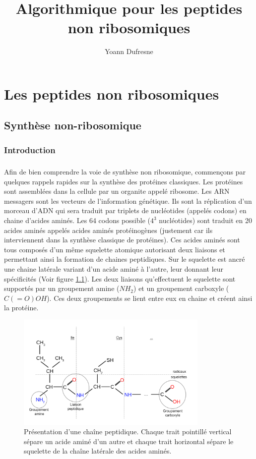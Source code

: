 \documentclass[12pt,french,twoside]{report}
\title{Algorithmique pour les peptides non ribosomiques}
\author{Yoann Dufresne}
\begin{document}
\maketitle
\tableofcontents

\chapter{Les peptides non ribosomiques}

\section{Synthèse non-ribosomique}

\subsection{Introduction}

\paragraph{}Afin de bien comprendre la voie de synthèse non ribosomique, commençons par quelques rappels rapides sur la synthèse des protéines classiques.
Les protéines sont assemblées dans la cellule par un organite appelé ribosome.
Les ARN messagers sont les vecteurs de l'information génétique.
Ils sont la réplication d'un morceau d'ADN qui sera traduit par triplets de nucléotides (appelés codons) en chaine d'acides aminés.
Les 64 codons possible ($4^3$ nucléotides) sont traduit en 20 acides aminés appelés acides aminés protéinogènes (justement car ils interviennent dans la synthèse classique de protéines).
Ces acides aminés sont tous composés d'un même squelette atomique autorisant deux liaisons et permettant ainsi la formation de chaines peptidiques.
Sur le squelette est ancré une chaine latérale variant d'un acide aminé à l'autre, leur donnant leur spécificités (Voir figure \ref{chaine_pep}).
Les deux liaisons qu'effectuent le squelette sont supportés par un groupement amine ($NH_2$) et un groupement carboxyle ($C(=O)OH$).
Ces deux groupements se lient entre eux en chaine et créent ainsi la protéine.

\begin{figure}[h!]
  \begin{center}
    \includegraphics[width=350px]{Figures/bio/Intro/chaine_pep.jpg}
    \caption{\label{chaine_pep}Présentation d'une chaîne peptidique.
    Chaque trait pointillé vertical sépare un acide aminé d'un autre et chaque trait horizontal sépare le squelette de la chaîne latérale des acides aminés.}
  \end{center}
\end{figure}
\end{document}
